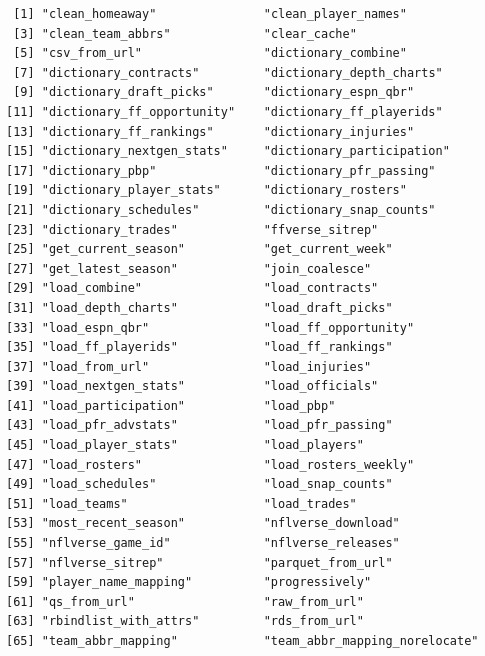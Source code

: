 \documentclass[
  letterpaper,
]{krantz}
\begin{document}
\begin{verbatim}
 [1] "clean_homeaway"               "clean_player_names"          
 [3] "clean_team_abbrs"             "clear_cache"                 
 [5] "csv_from_url"                 "dictionary_combine"          
 [7] "dictionary_contracts"         "dictionary_depth_charts"     
 [9] "dictionary_draft_picks"       "dictionary_espn_qbr"         
[11] "dictionary_ff_opportunity"    "dictionary_ff_playerids"     
[13] "dictionary_ff_rankings"       "dictionary_injuries"         
[15] "dictionary_nextgen_stats"     "dictionary_participation"    
[17] "dictionary_pbp"               "dictionary_pfr_passing"      
[19] "dictionary_player_stats"      "dictionary_rosters"          
[21] "dictionary_schedules"         "dictionary_snap_counts"      
[23] "dictionary_trades"            "ffverse_sitrep"              
[25] "get_current_season"           "get_current_week"            
[27] "get_latest_season"            "join_coalesce"               
[29] "load_combine"                 "load_contracts"              
[31] "load_depth_charts"            "load_draft_picks"            
[33] "load_espn_qbr"                "load_ff_opportunity"         
[35] "load_ff_playerids"            "load_ff_rankings"            
[37] "load_from_url"                "load_injuries"               
[39] "load_nextgen_stats"           "load_officials"              
[41] "load_participation"           "load_pbp"                    
[43] "load_pfr_advstats"            "load_pfr_passing"            
[45] "load_player_stats"            "load_players"                
[47] "load_rosters"                 "load_rosters_weekly"         
[49] "load_schedules"               "load_snap_counts"            
[51] "load_teams"                   "load_trades"                 
[53] "most_recent_season"           "nflverse_download"           
[55] "nflverse_game_id"             "nflverse_releases"           
[57] "nflverse_sitrep"              "parquet_from_url"            
[59] "player_name_mapping"          "progressively"               
[61] "qs_from_url"                  "raw_from_url"                
[63] "rbindlist_with_attrs"         "rds_from_url"                
[65] "team_abbr_mapping"            "team_abbr_mapping_norelocate"
\end{verbatim}
\end{document}
